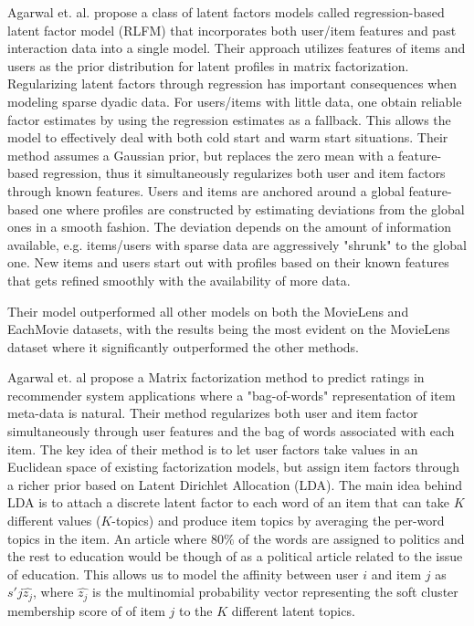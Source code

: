 Agarwal et. al. \cite{Agarwal2009} propose a class of latent factors models called regression-based latent factor model (RLFM) that incorporates both user/item features and past interaction data into a single model. Their approach utilizes features of items and users as the
prior distribution for latent profiles in matrix factorization. Regularizing latent factors through regression has important consequences when modeling sparse dyadic data. For users/items with little data, one obtain reliable factor estimates by using the regression estimates as a fallback. This allows the model to effectively deal with both cold start and warm start situations. Their method assumes a Gaussian prior, but replaces the zero mean with a feature-based regression, thus it simultaneously regularizes both user and item factors through known features. Users and items are anchored around a global feature-based one where profiles are constructed by estimating deviations from the global ones in a smooth fashion. The deviation depends on the amount of information available, e.g. items/users with sparse data are aggressively "shrunk" to the global one. New items and users start out with profiles based on their known features that gets refined smoothly with the availability of more data.

Their model outperformed all other models on both the MovieLens and EachMovie datasets, with the results being the most evident on the MovieLens dataset where it significantly outperformed the other methods.


Agarwal et. al \cite{Agarwal2010} propose a Matrix factorization method to predict ratings in recommender system
applications where a "bag-of-words" representation of item meta-data is natural. Their method regularizes both user and item factor simultaneously through user features and the bag of words associated with each item. The key idea of their method is to let user factors take values in an Euclidean space of existing factorization models, but assign item factors through a richer prior based on Latent Dirichlet Allocation (LDA). The main idea behind LDA is to attach a discrete latent factor to each word of an item that can take $K$ different values ($K$-topics) and produce item topics by averaging the per-word topics in the item. An article where 80$\%$ of the words are assigned to politics and the rest to education would be though of as a political article related to the issue of education. This allows us to model the affinity between user $i$ and item $j$ as $s'{j}\hat{z_{j}}$, where $\hat{z_{j}}$ is the multinomial probability vector representing the soft cluster membership score of of item $j$ to the $K$ different latent topics.

